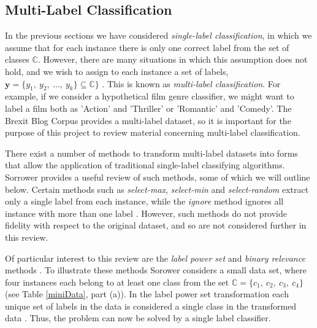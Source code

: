 \documentclass[Dissertation.tex]{subfiles}
\begin{document}
\subsection{Multi-Label Classification}\label{multiLabel}
In the previous sections we have considered \textit{single-label classification}, in which we assume  that for each instance there is only one correct label from the set of classes $ \mathbb{C} $. However, there are many situations in which this assumption does not hold, and we wish to assign to each instance a set of labels, $ \mathbf{y} = \{y_1,\ y_2,\  \dots, \ y_k\} \subseteq \mathbb{C}\} $ \cite{tsoumakasMiningMultilabelData2009}. This is known as \textit{multi-label classification}. For example, if we consider a hypothetical film genre classifier, we might want to label a film both as 'Action' and 'Thriller' or 'Romantic' and 'Comedy'. The Brexit Blog Corpus \cite{simakiAnnotatingSpeakerStance2017} provides a multi-label dataset, so it is important for the purpose of this project to review material concerning multi-label classification.

There exist a number of methods to transform multi-label datasets into forms that allow the application of traditional single-label classifying algorithms. Sorrower \cite{sorowerLiteratureSurveyAlgorithms2018} provides a useful review of such methods, some of which we will outline below. Certain methods such as \textit{select-max}, \textit{select-min} and \textit{select-random} extract only a single label from each instance, while the \textit{ignore} method ignores all instance with more than one label \cite{sorowerLiteratureSurveyAlgorithms2018}. However, such methods do not provide fidelity with respect to the original dataset, and so are not considered further in this review. 

Of particular interest to this review are the \textit{label power set} and \textit{binary relevance} methods \cite{sorowerLiteratureSurveyAlgorithms2018}. To illustrate these methods Sorower \cite{sorowerLiteratureSurveyAlgorithms2018} considers a small data set, where four instances each belong to at least one class from the set $\mathbb{C} = \{c_1, \ c_2, \ c_3, \ c_4\}$ (see Table \ref{miniData}, part (a)).  In the label power set transformation each unique set of labels in the data is considered a single class in the transformed data \cite{sorowerLiteratureSurveyAlgorithms2018}. Thus, the problem can now be solved by a single label classifier.
\end{document}
